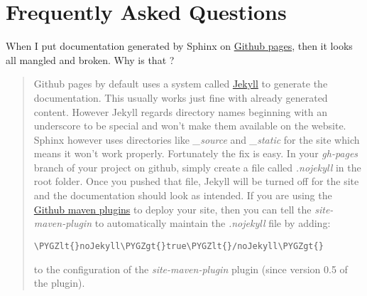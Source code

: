 \documentclass[letterpaper,10pt,english]{sphinxmanual}
\def\PYGZlt{\char`\<}
\def\PYGZgt{\char`\>}
\begin{document}
\chapter{Frequently Asked Questions}
\label{faq:jekyll}\label{faq::doc}\label{faq:frequently-asked-questions}
When I put documentation generated by Sphinx on \href{http://pages.github.com/}{Github pages}, then it looks all mangled and broken. Why is that ?
\begin{quote}

Github pages by default uses a system called \href{https://github.com/mojombo/jekyll/}{Jekyll} to generate the documentation. This usually
works just fine with already generated content. However Jekyll regards directory names beginning
with an underscore to be special and won't make them available on the website. Sphinx however uses
directories like \emph{\_source} and \emph{\_static} for the site which means it won't work properly. Fortunately
the fix is easy. In your \emph{gh-pages} branch of your project on github, simply create a file called \emph{.nojekyll}
in the root folder. Once you pushed that file, Jekyll will be turned off for the site and the
documentation should look as intended.
If you are using the \href{https://github.com/github/maven-plugins}{Github maven plugins} to deploy your site, then you can tell the \emph{site-maven-plugin} to
automatically maintain the \emph{.nojekyll} file by adding:

\begin{Verbatim}[commandchars=\\\{\}]
\PYGZlt{}noJekyll\PYGZgt{}true\PYGZlt{}/noJekyll\PYGZgt{}
\end{Verbatim}

to the configuration of the \emph{site-maven-plugin} plugin (since version 0.5 of the plugin).
\end{quote}



\renewcommand{\indexname}{Index}
\printindex
\end{document}

